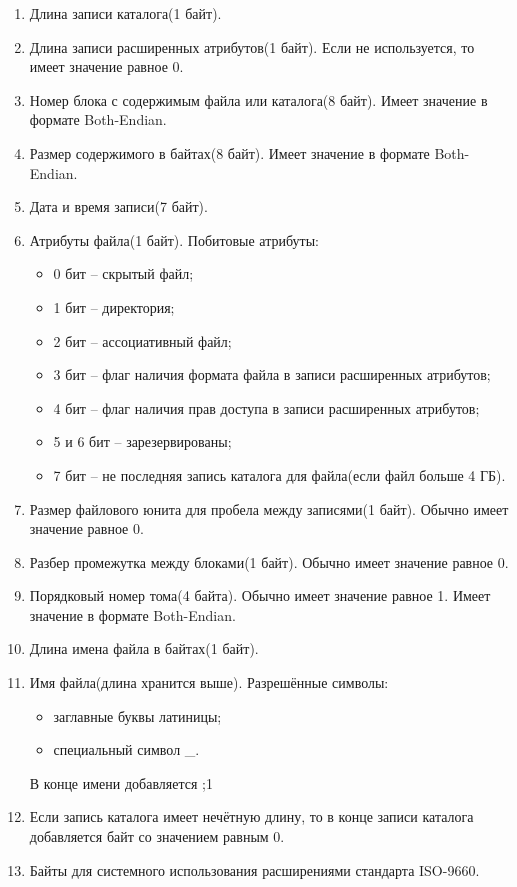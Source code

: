 \begin{enumerate}
\item Длина записи каталога(1 байт).
\item Длина записи расширенных атрибутов(1 байт). Если не используется, то имеет значение равное 0.
\item Номер блока с содержимым файла или каталога(8 байт). Имеет значение в формате Both-Endian.
\item Размер содержимого в байтах(8 байт). Имеет значение в формате Both-Endian.
\item Дата и время записи(7 байт).
\item Атрибуты файла(1 байт). Побитовые атрибуты:

	\begin{itemize}
	\item 0 бит -- скрытый файл;
	\item 1 бит -- директория;
	\item 2 бит -- ассоциативный файл;
	\item 3 бит -- флаг наличия формата файла в записи расширенных атрибутов;
	\item 4 бит -- флаг наличия прав доступа в записи расширенных атрибутов;
	\item 5 и 6 бит -- зарезервированы;
	\item 7 бит -- не последняя запись каталога для файла(если файл больше 4 ГБ).
	\end{itemize}
	
\item Размер файлового юнита для пробела между записями(1 байт). Обычно имеет значение равное 0. 
\item Разбер промежутка между блоками(1 байт). Обычно имеет значение равное 0. 
\item Порядковый номер тома(4 байта). Обычно имеет значение равное 1. Имеет значение в формате Both-Endian.
\item Длина имена файла в байтах(1 байт).
\item Имя файла(длина хранится выше). Разрешённые символы:

	\begin{itemize}
	\item заглавные буквы латиницы;
	\item специальный символ \_.
	\end{itemize}
	
В конце имени добавляется \textquotedbl;1\textquotedbl
\item Если запись каталога имеет нечётную длину, то в конце записи каталога добавляется байт со значением равным 0.
\item Байты для системного использования расширениями стандарта ISO-9660.
\end{enumerate}

